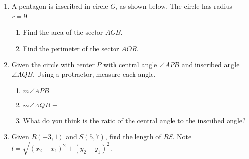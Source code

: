 \documentclass[12pt, twoside]{article}
\begin{document}
\begin{enumerate}
\newpage
\item A pentagon is inscribed in circle $O$, as shown below. The circle has radius $r=9$.
    \begin{multicols}{2}
    \raggedcolumns
    \begin{enumerate}
      \item Find the area of the sector $AOB$. \vspace{3cm}
      \item Find the perimeter of the sector $AOB$. %
    \end{enumerate}
    \end{multicols}  \vspace{1cm}

\item Given the circle with center $P$ with central angle $\angle APB$ and inscribed angle $\angle AQB$. Using a protractor, measure each angle.
  \begin{multicols}{2}
    \raggedcolumns
    \begin{enumerate}
      \item $m\angle APB=$ \vspace{0.7cm}
      \item $m\angle AQB=$ \vspace{0.7cm}
      \item What do you think is the ratio of the central angle to the inscribed angle?
    \end{enumerate}
  \end{multicols}

\item Given $R(-3,1)$ and $S(5,7)$, find the length of $\overline{RS}$. Note: $l=\sqrt{(x_2-x_1)^2+(y_2-y_1)^2}$. %
  

\end{enumerate}
\end{document}
